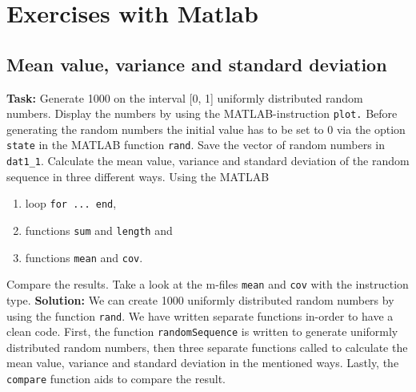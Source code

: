 
\chapter{Exercises with Matlab}


\section{ Mean value, variance and standard deviation } \label{ Mean value, variance and standard deviation} 
\noindent \textbf{Task:} Generate 1000 on the interval [0, 1] uniformly distributed random numbers. Display the numbers by using the MATLAB-instruction \texttt{plot.} Before generating the random numbers the initial value has to be set to 0 via the option \texttt{state} in the MATLAB function \texttt{rand}. Save the vector of random numbers in \texttt{dat1\_1}. Calculate the mean value, variance and standard deviation of the random sequence in three different ways.
\newline
\noindent Using the MATLAB
\begin{enumerate}
\item loop \texttt{for ... end},
\item functions \texttt{sum} and \texttt{length} and
\item functions \texttt{mean} and \texttt{cov}.
\end{enumerate}
Compare the results. Take a look at the m-files \texttt{mean} and \texttt{cov} with the instruction type. 
\noindent \textbf{Solution:}
\noindent We can create 1000 uniformly distributed random numbers by using the function \texttt{rand}. We have written separate functions in-order to have a clean code. First, the function \texttt{randomSequence} is written to generate uniformly distributed random numbers, then three separate functions called to calculate the mean value, variance and standard deviation in the mentioned ways. Lastly, the \texttt{compare} function aids to compare the result.

